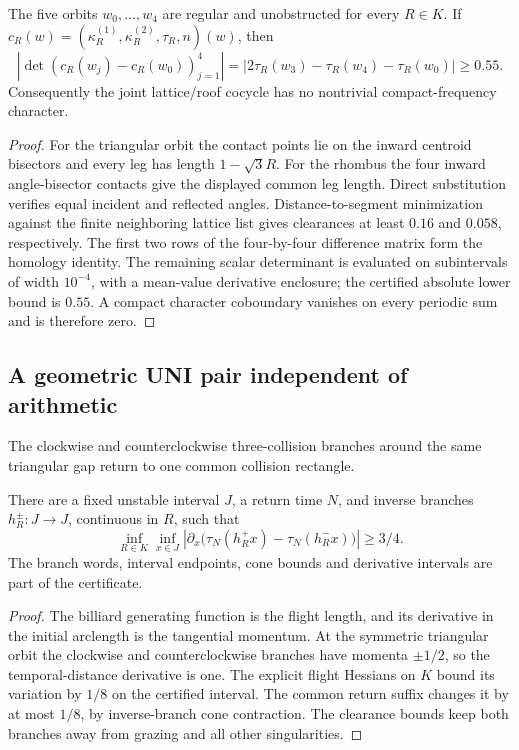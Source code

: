 \begin{lemma}
\label{lem:r10-a2-arithmetic}
The five orbits \(w_0,\ldots,w_4\) are regular and unobstructed for every
\(R\in K\).  If
\(c_R(w)=(\kappa_R^{(1)},\kappa_R^{(2)},\tau_R,n)(w)\), then
\[
 \left|\det(c_R(w_j)-c_R(w_0))_{j=1}^4\right|
 =|2\tau_R(w_3)-\tau_R(w_4)-\tau_R(w_0)|\ge0.55.
\]
Consequently the joint lattice/roof cocycle has no nontrivial compact-frequency
character.
\end{lemma}

\begin{proof}
For the triangular orbit the contact points lie on the inward centroid
bisectors and every leg has length \(1-\sqrt3R\).  For the rhombus the four
inward angle-bisector contacts give the displayed common leg length.  Direct
substitution verifies equal incident and reflected angles.  Distance-to-segment
minimization against the finite neighboring lattice list gives clearances at
least \(0.16\) and \(0.058\), respectively.  The first two rows of the
four-by-four difference matrix form the homology identity.  The remaining
scalar determinant is evaluated on subintervals of width \(10^{-4}\), with a
mean-value derivative enclosure; the certified absolute lower bound is
\(0.55\).  A compact character coboundary vanishes on every periodic sum and
is therefore zero.
\end{proof}

\subsection{A geometric UNI pair independent of arithmetic}

The clockwise and counterclockwise three-collision branches around the same
triangular gap return to one common collision rectangle.

\begin{theorem}
\label{thm:r10-a2-uni}
There are a fixed unstable interval \(J\), a return time \(N\), and inverse
branches \(h_R^\pm:J\to J\), continuous in \(R\), such that
\[
 \inf_{R\in K}\inf_{x\in J}
 \left|\partial_x\bigl(\tau_N(h_R^+x)-\tau_N(h_R^-x)\bigr)\right|
 \ge 3/4.
\]
The branch words, interval endpoints, cone bounds and derivative intervals are
part of the certificate.
\end{theorem}

\begin{proof}
The billiard generating function is the flight length, and its derivative in
the initial arclength is the tangential momentum.  At the symmetric triangular
orbit the clockwise and counterclockwise branches have momenta \(\pm1/2\), so
the temporal-distance derivative is one.  The explicit flight Hessians on
\(K\) bound its variation by \(1/8\) on the certified interval.  The common
return suffix changes it by at most \(1/8\), by inverse-branch cone
contraction.  The clearance bounds keep both branches away from grazing and
all other singularities.
\end{proof}

